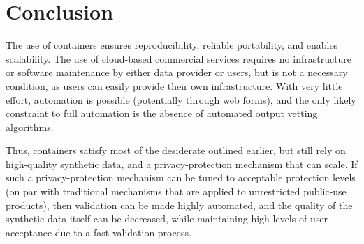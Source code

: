 \documentclass{article}
\begin{document}
\section{Conclusion}

The use of containers ensures reproducibility, reliable portability, and enables scalability. The use of cloud-based commercial services requires no infrastructure or software maintenance by either data provider or users, but is not a necessary condition, as users can easily provide their own infrastructure. With very little effort, automation is possible (potentially through web forms), and the only likely constraint to full automation is the absence of automated output vetting algorithms. 

Thus, containers satisfy most of the desiderate outlined earlier, but still rely on high-quality synthetic data, and a privacy-protection mechanism that can scale. If such a privacy-protection mechanism can be tuned to acceptable protection levels (on par with traditional mechanisms that are applied to unrestricted public-use products), then validation can be made highly automated, and the quality of the synthetic data itself can be decreased, while maintaining high levels of user acceptance due to a fast validation process.

\end{document}
